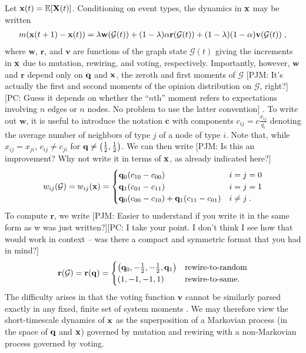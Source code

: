 \documentclass[review, onefignum, onetabnum]{siamart171218}
\newcommand{\pjm}[1]{{\color{blue}[PJM: #1]}}
\newcommand{\pc}[1]{{\color{comment_purple}[PC: #1]}}
\begin{document}
	Let $\mathbf{x}(t) = \mathbb{E}[\mathbf{X}(t)]$. 
	Conditioning on event types, the dynamics in $\mathbf{x}$ may be written
	\begin{align}
		m(\x(t+1) - \x(t)) = \lambda \mathbf{w}(\mathcal{G}(t)) + (1-\lambda)\alpha \mathbf{r}(\mathcal{G}(t)) + (1-\lambda)(1-\alpha) \mathbf{v}(\mathcal{G}(t))\;, \label{eq:dynamics}
	\end{align}
	where $\mathbf{w}$, $\mathbf{r}$, and $\mathbf{v}$ are functions of the graph state $\mathcal{G}(t)$ giving the increments in $\mathbf{x}$ due to mutation, rewiring, and voting, respectively. 
	Importantly, however, $\mathbf{w}$ and $\mathbf{r}$ depend only on $\mathbf{q}$ and $\mathbf{x}$, the zeroth and first moments of $\mathcal{G}$ \pjm{It's actually the first and second moments of the opinion distribution on $\mathcal{G}$, right?}\pc{Guess it depends on whether the ``$n$th'' moment refers to expectations involving $n$ edges or $n$ nodes. No problem to use the latter convention} . 
	To write out $\mathbf{w}$, it is useful to introduce the notation $\mathbf{c}$ with components $c_{ij} = c\frac{x_{ij}}{q_i}$ denoting the average number of neighbors of type $j$ of a node of type $i$. 
	Note that, while $x_{ij} = x_{ji}$, $c_{ij} \neq c_{ji}$ for $\mathbf{q} \neq \left(\frac{1}{2}, \frac{1}{2}\right)$. 
	We can then write \pjm{Is this an improvement? Why not write it in terms of $\mathbf{x}$, as already indicated here?}
	\begin{align*}
		w_{ij}(\mathcal{G}) = w_{ij}(\mathbf{x}) = 
		\begin{cases}
			\mathbf{q}_{0}(c_{10} - c_{00}) &  i = j = 0 \\ 
			\mathbf{q}_1 (c_{01}-c_{11}) & i = j = 1 \\ 
			\mathbf{q}_0 (c_{00}  - c_{10}) +  \mathbf{q}_1(c_{11}-c_{01}) & i \neq j\;.
		\end{cases}
	\end{align*}
	To compute $\mathbf{r}$, we write \pjm{Easier to understand if you write it in the same form as w was just written?}\pc{I take your point. I don't think I see how that would work in context -- was there a compact and symmetric format that you had in mind?}
	\begin{align*}
		\mathbf{r}(\mathcal{G}) = \mathbf{r}(\mathbf{q}) = 
		\begin{cases}
			\left(\mathbf{q}_0, -\frac{1}{2}, -\frac{1}{2}, \mathbf{q}_1\right) & \text{rewire-to-random}\\
			\left(1, -1, -1, 1\right) & \text{rewire-to-same}.
		\end{cases}
	\end{align*}
	The difficulty arises in that the voting function $\mathbf{v}$ cannot be similarly parsed exactly in any fixed, finite set of system moments \cite{Demirel2012}. 
	We may therefore view the short-timescale dynamics of $\mathbf{x}$ as the superposition of a Markovian process (in the space of $\mathbf{q}$ and $\mathbf{x}$) governed by mutation and rewiring with a non-Markovian process governed by voting. 
	
\end{document}
